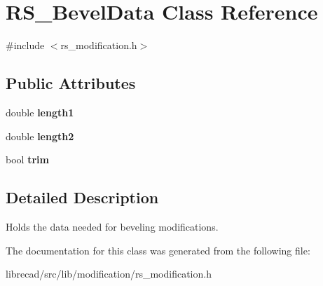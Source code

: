 \hypertarget{classRS__BevelData}{\section{R\-S\-\_\-\-Bevel\-Data Class Reference}
\label{classRS__BevelData}
}


{\ttfamily \#include $<$rs\-\_\-modification.\-h$>$}

\subsection*{Public Attributes}
\begin{DoxyCompactItemize}
\item 
\hypertarget{classRS__BevelData_a610352f86a6a188ed97a32eaea60f575}{double {\bfseries length1}}\label{classRS__BevelData_a610352f86a6a188ed97a32eaea60f575}

\item 
\hypertarget{classRS__BevelData_aff7c51f4e902c5be162290717d0587dd}{double {\bfseries length2}}\label{classRS__BevelData_aff7c51f4e902c5be162290717d0587dd}

\item 
\hypertarget{classRS__BevelData_ad61fb41b1ec57b795295cf8c48d51c73}{bool {\bfseries trim}}\label{classRS__BevelData_ad61fb41b1ec57b795295cf8c48d51c73}

\end{DoxyCompactItemize}


\subsection{Detailed Description}
Holds the data needed for beveling modifications. 

The documentation for this class was generated from the following file\-:\begin{DoxyCompactItemize}
\item 
librecad/src/lib/modification/rs\-\_\-modification.\-h\end{DoxyCompactItemize}
